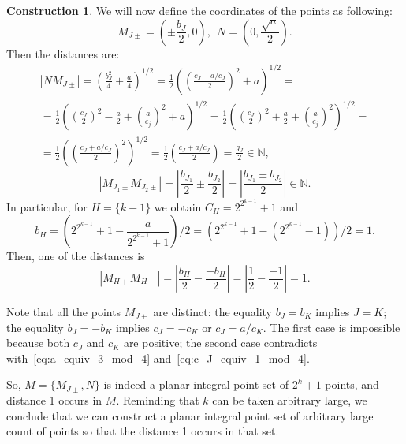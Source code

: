 \documentclass[a4paper,14pt]{article} %
\theoremstyle{plain}
\theoremstyle{definition}
\newtheorem{construction}[theorem]{Construction}
\begin{document}
\begin{construction}
	We will now define the coordinates of the points as following:
	\begin{equation}
		M_{J\pm} =\left(\pm\frac{b_J}{2}, 0\right)
		,
		~~
		N   =\left(0, \frac{\sqrt{a}}{2}\right)
		.
	\end{equation}
	Then the distances are:
	\begin{multline}
		|N M_{J\pm}|
		=
		\left(\frac{b_J^2}{4} + \frac{a}{4}\right)^{1/2}
		=
		\frac{1}{2}\left(\left(\frac{c_J - a/c_J}{2}\right)^2 + a\right)^{1/2}
		=
		\\=
		\frac{1}{2}\left( \left(\frac{c_J}{2}\right)^2 - \frac{a}{2} + \left(\frac{a}{c_j}\right)^2 + a\right)^{1/2}
		=
		\frac{1}{2}\left( \left(\frac{c_J}{2}\right)^2 + \frac{a}{2} + \left(\frac{a}{c_j}\right)^2    \right)^{1/2}
		=
		\\=
		\frac{1}{2}\left(\left(\frac{c_J + a/c_J}{2}\right)^2\right)^{1/2}
		=
		\frac{1}{2}\left(\frac{c_J + a/c_J}{2}\right)
		=
		\frac{g_J}{2}
		\in\mathbb{N}
		,
	\end{multline}
	\begin{equation}
		|M_{J_1 \pm}  M_{J_2 \pm}|
		=
		\left|\frac{b_{J_1}}{2} \pm \frac{b_{J_2}}{2}\right|
		=
		\left|\frac{b_{J_1} \pm b_{J_2}}{2}\right|
		\in\mathbb{N}
		.
	\end{equation}
	In particular, for $H = \{k-1\}$ we obtain $C_H = 2^{2^{k-1}}+1$ and
	\begin{equation}
		b_H =
		\left( 2^{2^{k-1}}+1 - \frac{a}{2^{2^{k-1}}+1} \right)/2
		=
		\left(2^{2^{k-1}}+1 - \left(  2^{2^{k-1}}-1 \right) \right)/2
		=
		1
		.
	\end{equation}
	Then, one of the distances is
	\begin{equation}
		|M_{H+}  M_{H-}|
		=
		\left|\frac{b_{H}}{2} - \frac{-b_{H}}{2}\right|
		=
		\left|\frac{1}{2} - \frac{-1}{2}\right|
		= 1
		.
	\end{equation}

	Note that all the points $M_{J\pm}$ are distinct:
	the equality $b_J =  b_K$ implies $J=K$;
	the equality $b_J = -b_K$ implies $c_J = -c_K$ or $c_J = a / c_K$.
	The first case is impossible because both $c_J$ and $c_K$ are positive;
	the second case contradicts with~\eqref{eq:a_equiv_3_mod_4} and~\eqref{eq:c_J_equiv_1_mod_4}.


	So, $M = \{ M_{J\pm}, N\}$ is indeed a planar integral point set of $2^k+1$ points,
	and distance 1 occurs in $M$.
	Reminding that $k$ can be taken arbitrary large, we conclude that we can construct
	a planar integral point set of arbitrary large count of points so that the distance 1 occurs in that set.
\end{construction}
\end{document}
